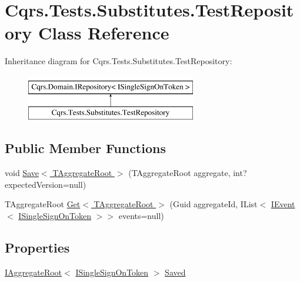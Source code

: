 \hypertarget{classCqrs_1_1Tests_1_1Substitutes_1_1TestRepository}{}\section{Cqrs.\+Tests.\+Substitutes.\+Test\+Repository Class Reference}
\label{classCqrs_1_1Tests_1_1Substitutes_1_1TestRepository}
Inheritance diagram for Cqrs.\+Tests.\+Substitutes.\+Test\+Repository\+:\begin{figure}[H]
\begin{center}
\leavevmode
\includegraphics[height=2.000000cm]{classCqrs_1_1Tests_1_1Substitutes_1_1TestRepository}
\end{center}
\end{figure}
\subsection*{Public Member Functions}
\begin{DoxyCompactItemize}
\item 
void \hyperlink{classCqrs_1_1Tests_1_1Substitutes_1_1TestRepository_a8e387f387f4077001298fb78dbba0c45}{Save$<$ T\+Aggregate\+Root $>$} (T\+Aggregate\+Root aggregate, int? expected\+Version=null)
\item 
T\+Aggregate\+Root \hyperlink{classCqrs_1_1Tests_1_1Substitutes_1_1TestRepository_a506da3fc19c405a74237aadbf59ecd6b}{Get$<$ T\+Aggregate\+Root $>$} (Guid aggregate\+Id, I\+List$<$ \hyperlink{interfaceCqrs_1_1Events_1_1IEvent}{I\+Event}$<$ \hyperlink{interfaceCqrs_1_1Authentication_1_1ISingleSignOnToken}{I\+Single\+Sign\+On\+Token} $>$$>$ events=null)
\end{DoxyCompactItemize}
\subsection*{Properties}
\begin{DoxyCompactItemize}
\item 
\hyperlink{interfaceCqrs_1_1Domain_1_1IAggregateRoot}{I\+Aggregate\+Root}$<$ \hyperlink{interfaceCqrs_1_1Authentication_1_1ISingleSignOnToken}{I\+Single\+Sign\+On\+Token} $>$ \hyperlink{classCqrs_1_1Tests_1_1Substitutes_1_1TestRepository_ab0948780928642027f86a02c74d010d0}{Saved}
\end{DoxyCompactItemize}


